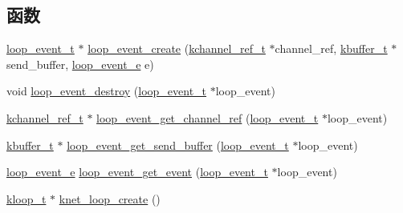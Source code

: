 \subsection*{函数}
\begin{DoxyCompactItemize}
\item 
\hyperlink{a00076_a1095ee772017ce29dcac0987c456709e_a1095ee772017ce29dcac0987c456709e}{loop\+\_\+event\+\_\+t} $\ast$ \hyperlink{a00076_a28f7237bd68f7b5bc5b52c8842d57407_a28f7237bd68f7b5bc5b52c8842d57407}{loop\+\_\+event\+\_\+create} (\hyperlink{a00056_a3b7e82599367eade261456f60ebe2cd9_a3b7e82599367eade261456f60ebe2cd9}{kchannel\+\_\+ref\+\_\+t} $\ast$channel\+\_\+ref, \hyperlink{a00056_a4b09a7574cd440f9b94285ab73c81b4e_a4b09a7574cd440f9b94285ab73c81b4e}{kbuffer\+\_\+t} $\ast$send\+\_\+buffer, \hyperlink{a00076_ab92fe4e788615cfd56530167651a8ff4_ab92fe4e788615cfd56530167651a8ff4}{loop\+\_\+event\+\_\+e} e)
\item 
void \hyperlink{a00076_af79be13eb9a10b31227e808c44004f53_af79be13eb9a10b31227e808c44004f53}{loop\+\_\+event\+\_\+destroy} (\hyperlink{a00076_a1095ee772017ce29dcac0987c456709e_a1095ee772017ce29dcac0987c456709e}{loop\+\_\+event\+\_\+t} $\ast$loop\+\_\+event)
\item 
\hyperlink{a00056_a3b7e82599367eade261456f60ebe2cd9_a3b7e82599367eade261456f60ebe2cd9}{kchannel\+\_\+ref\+\_\+t} $\ast$ \hyperlink{a00076_a868256d58089c95006c0a0b051c34b12_a868256d58089c95006c0a0b051c34b12}{loop\+\_\+event\+\_\+get\+\_\+channel\+\_\+ref} (\hyperlink{a00076_a1095ee772017ce29dcac0987c456709e_a1095ee772017ce29dcac0987c456709e}{loop\+\_\+event\+\_\+t} $\ast$loop\+\_\+event)
\item 
\hyperlink{a00056_a4b09a7574cd440f9b94285ab73c81b4e_a4b09a7574cd440f9b94285ab73c81b4e}{kbuffer\+\_\+t} $\ast$ \hyperlink{a00076_a871ad74767d178e69c00583654f92e32_a871ad74767d178e69c00583654f92e32}{loop\+\_\+event\+\_\+get\+\_\+send\+\_\+buffer} (\hyperlink{a00076_a1095ee772017ce29dcac0987c456709e_a1095ee772017ce29dcac0987c456709e}{loop\+\_\+event\+\_\+t} $\ast$loop\+\_\+event)
\item 
\hyperlink{a00076_ab92fe4e788615cfd56530167651a8ff4_ab92fe4e788615cfd56530167651a8ff4}{loop\+\_\+event\+\_\+e} \hyperlink{a00076_ad74c97ed1010b1d0434269b5b01f5829_ad74c97ed1010b1d0434269b5b01f5829}{loop\+\_\+event\+\_\+get\+\_\+event} (\hyperlink{a00076_a1095ee772017ce29dcac0987c456709e_a1095ee772017ce29dcac0987c456709e}{loop\+\_\+event\+\_\+t} $\ast$loop\+\_\+event)
\item 
\hyperlink{a00056_a97fc76209a58362019f1ded9169e397f_a97fc76209a58362019f1ded9169e397f}{kloop\+\_\+t} $\ast$ \hyperlink{a00117_ga2e4181ebe9c1769be90bb8dc0e5cdffe_ga2e4181ebe9c1769be90bb8dc0e5cdffe}{knet\+\_\+loop\+\_\+create} ()

\end{DoxyCompactItemize}
